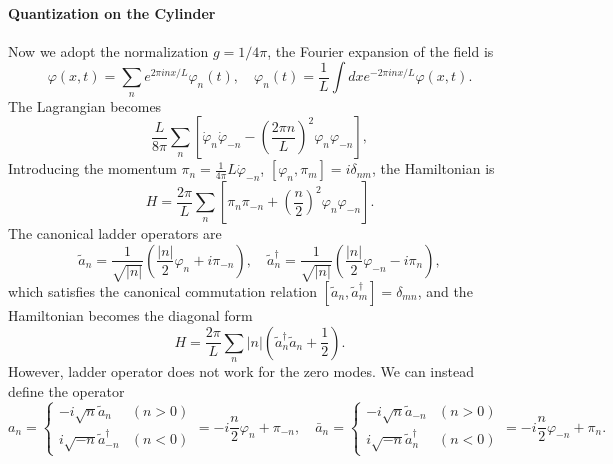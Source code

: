 \documentclass[aps,prb,superscriptaddress,nofootinbib]{revtex4}
\begin{document}
\paragraph*{Quantization on the Cylinder}
Now we adopt the normalization $g = 1/4\pi$, the Fourier expansion of the field is
\begin{equation}
	\varphi(x, t) =\sum_{n} e^{2 \pi i n x / L} \varphi_{n}(t), \quad
	\varphi_{n}(t) =\frac{1}{L} \int d x e^{-2 \pi i n x / L} \varphi(x, t).
\end{equation}
The Lagrangian becomes
\begin{equation}
	\frac{L}{8\pi} \sum_{n}\left[\dot{\varphi}_{n} \dot{\varphi}_{-n}-\left(\frac{2 \pi n}{L}\right)^{2} \varphi_{n} \varphi_{-n}\right],
\end{equation}
Introducing the momentum $\pi_n=\frac{1}{4\pi} L \dot{\varphi}_{-n}$, $\left[\varphi_{n}, \pi_{m}\right]=i \delta_{n m}$, the Hamiltonian is
\begin{equation}
	H=\frac{2\pi}{L} \sum_{n}\left[\pi_{n} \pi_{-n}+ \left(\frac{n}{2}\right)^2 \varphi_{n} \varphi_{-n}\right].
\end{equation}
The canonical ladder operators are
\begin{equation}
	\tilde a_n = \frac{1}{\sqrt{|n|}}\left(\frac{|n|}{2}\varphi_n + i\pi_{-n}\right), \quad
	\tilde a_n^\dagger = \frac{1}{\sqrt{|n|}}\left(\frac{|n|}{2}\varphi_{-n} - i\pi_{n}\right),
\end{equation}
which satisfies the canonical commutation relation $[\tilde a_n, \tilde a_m^\dagger] = \delta_{mn}$, and the Hamiltonian becomes the diagonal form
\begin{equation}
	H = \frac{2\pi}{L} \sum_n |n| \left(\tilde a_n^\dagger \tilde a_n + \frac{1}{2} \right).
\end{equation}
However, ladder operator does not work for the zero modes.
We can instead define the operator
\begin{equation}
	a_{n} = \begin{cases}
		-i \sqrt{n} \tilde{a}_{n} & (n>0) \\
		i \sqrt{-n} \tilde{a}_{-n}^{\dagger} & (n<0)
	\end{cases}
	= -i\frac{n}{2} \varphi_n + \pi_{-n}, \quad
	\bar a_{n} = \begin{cases}
		-i \sqrt{n} \tilde{a}_{-n} & (n>0) \\
		i \sqrt{-n} \tilde{a}_{n}^{\dagger} & (n<0)
	\end{cases}
	= -i\frac{n}{2} \varphi_{-n} + \pi_{n}.
\end{equation}
\end{document}
